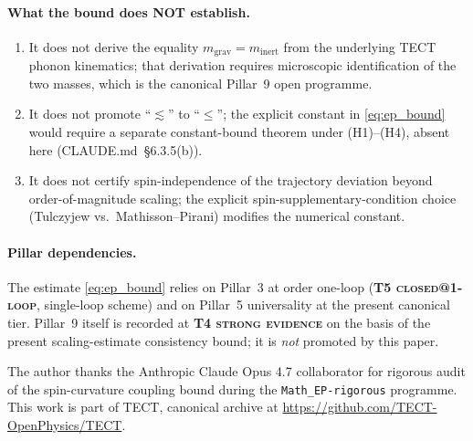 \paragraph{What the bound does NOT establish.}
\begin{enumerate}
  \item It does not derive the equality
    $m_{\mathrm{grav}} = m_{\mathrm{inert}}$ from the underlying TECT
    phonon kinematics; that derivation requires microscopic
    identification of the two masses, which is the canonical Pillar~9
    open programme.
  \item It does not promote ``$\lesssim$'' to ``$\leq$''; the explicit
    constant in \eqref{eq:ep_bound} would require a separate
    constant-bound theorem under (H1)--(H4), absent here
    (CLAUDE.md~§6.3.5(b)).
  \item It does not certify spin-independence of the trajectory
    deviation beyond order-of-magnitude scaling; the explicit
    spin-supplementary-condition choice (Tulczyjew vs.\
    Mathisson--Pirani) modifies the numerical constant.
\end{enumerate}

\paragraph{Pillar dependencies.}
The estimate \eqref{eq:ep_bound} relies on Pillar~3 at order one-loop
(\textbf{T5 \textsc{closed@1-loop}}, single-loop scheme) and on
Pillar~5 universality at the present canonical tier. Pillar~9 itself
is recorded at \textbf{T4 \textsc{strong evidence}} on the basis of
the present scaling-estimate consistency bound; it is \emph{not}
promoted by this paper.

\begin{acknowledgments}
The author thanks the Anthropic Claude Opus 4.7 collaborator for rigorous
audit of the spin-curvature coupling bound during the
\texttt{Math\_EP-rigorous} programme. This work is part of TECT, canonical archive at
\url{https://github.com/TECT-OpenPhysics/TECT}.
\end{acknowledgments}





